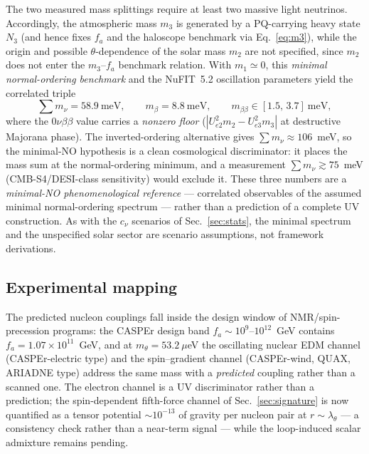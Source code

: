 \documentclass[11pt,a4paper]{article}
\begin{document}
The two measured mass splittings require at least two massive light
neutrinos. Accordingly, the atmospheric mass $m_3$ is generated by a
PQ-carrying heavy state $N_3$
(and hence fixes $f_a$ and the haloscope benchmark via
Eq.~\eqref{eq:m3}), while the origin and possible $\theta$-dependence of
the solar mass $m_2$ are not specified, since $m_2$ does not enter the
$m_3$--$f_a$ benchmark relation.
With
$m_1 \simeq 0$, this \emph{minimal normal-ordering benchmark} and the
NuFIT~5.2 oscillation parameters \cite{NuFIT}
yield the correlated triple
\begin{equation}
\sum m_\nu = 58.9~\text{meV},\qquad
m_\beta = 8.8~\text{meV},\qquad
m_{\beta\beta} \in [1.5,\,3.7]~\text{meV},
\label{eq:rank1}
\end{equation}
where the $0\nu\beta\beta$ value carries a \emph{nonzero floor}
($|U_{e2}^{2} m_2 - U_{e3}^{2} m_3|$ at destructive Majorana phase).
The inverted-ordering alternative gives
$\sum m_\nu \approx 106$~meV, so the minimal-NO hypothesis is a clean
cosmological discriminator: it places the mass sum at the normal-ordering
minimum, and a measurement $\sum m_\nu \gtrsim 75$~meV (CMB-S4/DESI-class
sensitivity) would exclude it. These three numbers are a
\emph{minimal-NO phenomenological reference} --- correlated observables of
the assumed minimal normal-ordering spectrum --- rather than a prediction
of a complete UV construction. As with the $c_\nu$ scenarios of
Sec.~\ref{sec:stats}, the minimal spectrum and the unspecified solar sector
are scenario assumptions, not framework derivations.

\subsection{Experimental mapping}
\label{sec:mapping}

The predicted nucleon couplings fall inside the design window of
NMR/spin-precession programs: the CASPEr design band
$f_a \sim 10^{9}$--$10^{12}$~GeV \cite{CASPEr} contains
$f_a = 1.07\times 10^{11}$~GeV, and at $m_\theta = 53.2~\mu$eV the
oscillating nuclear EDM channel (CASPEr-electric type) and the
spin--gradient channel (CASPEr-wind, QUAX, ARIADNE type) address the same
mass with a \emph{predicted} coupling rather than a scanned one. The
electron channel is a UV discriminator rather than a prediction; the
spin-dependent fifth-force channel of Sec.~\ref{sec:signature} is now
quantified as a tensor potential $\sim 10^{-13}$ of gravity per nucleon
pair at $r\sim\lambda_\theta$ --- a consistency check rather than a
near-term signal --- while the loop-induced scalar admixture remains
pending.
\end{document}
